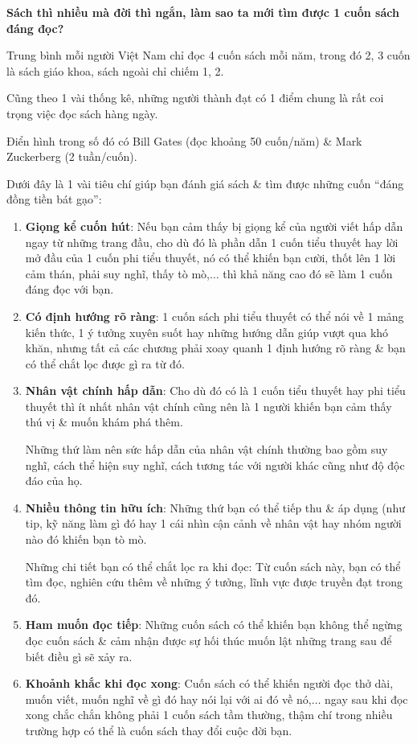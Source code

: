 \documentclass{article}
\begin{document}
\textbf{ Sách thì nhiều mà đời thì ngắn, làm sao ta mới tìm được 1 cuốn sách đáng đọc?}

%
Trung bình mỗi người Việt Nam chỉ đọc 4 cuốn sách mỗi năm, trong đó 2, 3 cuốn là sách giáo khoa, sách ngoài chỉ chiếm 1, 2.

%
Cũng theo 1 vài thống kê, những người thành đạt có 1 điểm chung là rất coi trọng việc đọc sách hàng ngày.

Điển hình trong số đó có Bill Gates (đọc khoảng 50 cuốn/năm) \& Mark Zuckerberg (2 tuần/cuốn).

%
Dưới đây là 1 vài tiêu chí giúp bạn đánh giá sách \& tìm được những cuốn ``đáng đồng tiền bát gạo'':
\begin{enumerate}
	\item \textbf{Giọng kể cuốn hút}: Nếu bạn cảm thấy bị giọng kể của người viết hấp dẫn ngay từ những trang đầu, cho dù đó là phần dẫn 1 cuốn tiểu thuyết hay lời mở đầu của 1 cuốn phi tiểu thuyết, nó có thể khiến bạn cười, thốt lên 1 lời cảm thán, phải suy nghĩ, thấy tò mò,$\ldots$ thì khả năng cao đó sẽ làm 1 cuốn đáng đọc với bạn.
	\item \textbf{Có định hướng rõ ràng}: 1 cuốn sách phi tiểu thuyết có thể nói về 1 mảng kiến thức, 1 ý tưởng xuyên suốt hay những hướng dẫn giúp vượt qua khó khăn, nhưng tất cả các chương phải xoay quanh 1 định hướng rõ ràng \& bạn có thể chắt lọc được gì ra từ đó.
	\item \textbf{Nhân vật chính hấp dẫn}: Cho dù đó có là 1 cuốn tiểu thuyết hay phi tiểu thuyết thì ít nhất nhân vật chính cũng nên là 1 người khiến bạn cảm thấy thú vị \& muốn khám phá thêm.
	
	Những thứ làm nên sức hấp dẫn của nhân vật chính thường bao gồm suy nghĩ, cách thể hiện suy nghĩ, cách tương tác với người khác cũng như độ độc đáo của họ.
	\item \textbf{Nhiều thông tin hữu ích}: Những thứ bạn có thể tiếp thu \& áp dụng (như tip, kỹ năng làm gì đó hay 1 cái nhìn cận cảnh về nhân vật hay nhóm người nào đó khiến bạn tò mò.
	
	Những chi tiết bạn có thể chắt lọc ra khi đọc: Từ cuốn sách này, bạn có thể tìm đọc, nghiên cứu thêm về những ý tưởng, lĩnh vực được truyền đạt trong đó.
	\item \textbf{Ham muốn đọc tiếp}: Những cuốn sách có thể khiến bạn không thể ngừng đọc cuốn sách \& cảm nhận được sự hối thúc muốn lật những trang sau để biết điều gì sẽ xảy ra.
	\item \textbf{Khoảnh khắc khi đọc xong}: Cuốn sách có thể khiến người đọc thở dài, muốn viết, muốn nghĩ về gì đó hay nói lại với ai đó về nó,$\ldots$ ngay sau khi đọc xong chắc chắn không phải 1 cuốn sách tầm thường, thậm chí trong nhiều trường hợp có thể là cuốn sách thay đổi cuộc đời bạn.
\end{enumerate}
\end{document}
